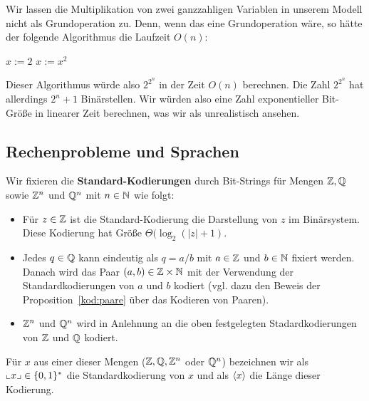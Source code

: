 
\begin{bem} 
Wir lassen die Multiplikation von zwei ganzzahligen Variablen in unserem Modell nicht als Grundoperation zu. Denn, wenn das eine Grundoperation wäre, so hätte der folgende Algorithmus die Laufzeit $O(n)$: 

\begin{center}
	\begin{algorithmic}
		\STATE $x:=2$
		\STATE $x:=x^2$
		\ENDFOR
	\end{algorithmic}
\end{center}

Dieser Algorithmus würde also $2^{2^n}$ in der Zeit $O(n)$ berechnen. Die Zahl $2^{2^n}$ hat allerdings $2^n+1$ Binärstellen. Wir würden also eine Zahl exponentieller Bit-Größe in linearer Zeit berechnen, was wir als unrealistisch ansehen. 
\end{bem}


\subsection{Rechenprobleme und Sprachen}
\label{sect:rechenprobleme}

\begin{defn}
	Wir fixieren die \textbf{Standard-Kodierungen} durch Bit-Strings für Mengen $\mathbb{Z}, \mathbb{Q}$ sowie $\mathbb{Z}^n$ und $\mathbb{Q}^n$ mit $n \in \mathbb{N}$ wie folgt: 
	\begin{itemize}
		\item Für $z \in \mathbb{Z}$ ist die Standard-Kodierung die Darstellung von $z$ im Binärsystem. Diese Kodierung hat Größe $\Theta(\log_2 (|z|+1)$. 
		\item Jedes $q \in \mathbb{Q}$ kann eindeutig als $q = a/b$ mit $a \in \mathbb{Z}$ und $b \in \mathbb{N}$ fixiert werden. Danach wird das Paar $(a,b) \in \mathbb{Z} \times \mathbb{N}$ mit der Verwendung der Standardkodierungen von $a$ und $b$ kodiert (vgl. dazu den Beweis der Proposition~\eqref{kod:paare} über das Kodieren von Paaren). 
		\item $\mathbb{Z}^n$ und $\mathbb{Q}^n$ wird in Anlehnung an die oben festgelegten Stadardkodierungen von $\mathbb{Z}$ und $\mathbb{Q}$ kodiert. 
	\end{itemize} 
	Für $x$ aus einer dieser Mengen ($\mathbb{Z},\mathbb{Q}, \mathbb{Z}^n$ oder $\mathbb{Q}^n$) bezeichnen wir als ${\llcorner x\lrcorner} \in \{0,1\}^\ast$ die Standardkodierung von $x$ und als $\langle x \rangle$ die Länge dieser Kodierung. 
\end{defn} 

